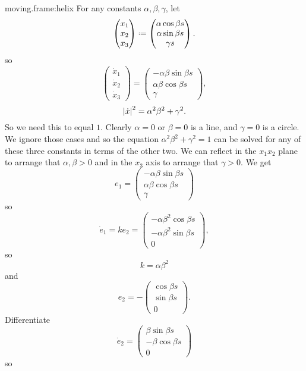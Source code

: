 \begin{answer}{moving.frame:helix}
For any constants \(\alpha,\beta,\gamma\), let
\[
\begin{pmatrix}
x_1\\
x_2\\
x_3
\end{pmatrix}
\defeq
\begin{pmatrix}
\alpha \cos \beta s \\
\alpha \sin \beta s\\
\gamma s
\end{pmatrix}.
\]
so
\[
\begin{pmatrix}
\dot{x}_1\\
\dot{x}_2\\
\dot{x}_3
\end{pmatrix}
=
\begin{pmatrix}
-\alpha\beta \sin \beta s \\
\alpha \beta \cos \beta s\\
\gamma
\end{pmatrix},
\]
\[
\norm{\dot{x}}^2=\alpha^2\beta^2+\gamma^2.
\]
So we need this to equal \(1\).
Clearly \(\alpha=0\) or \(\beta=0\) is a line, and \(\gamma=0\) is a circle.
We ignore those cases and so the equation \(\alpha^2\beta^2+\gamma^2=1\) can be solved for any of these three constants in terms of the other two.
We can reflect in the \(x_1x_2\) plane to arrange that \(\alpha,\beta>0\) and in the \(x_3\) axis to arrange that \(\gamma>0\).
We get
\[
e_1
=
\begin{pmatrix}
-\alpha\beta \sin \beta s \\
\alpha \beta \cos \beta s\\
\gamma
\end{pmatrix}
\]
so
\[
\dot{e}_1=ke_2=
\begin{pmatrix}
-\alpha\beta^2 \cos \beta s \\
-\alpha \beta^2 \sin \beta s\\
0
\end{pmatrix},
\]
so
\[
k=\alpha\beta^2
\]
and
\[
e_2=
-
\begin{pmatrix}
\cos \beta s \\
\sin \beta s\\
0
\end{pmatrix}.
\]
Differentiate
\[
\dot{e}_2
=
\begin{pmatrix}
\beta\sin \beta s \\
-\beta\cos \beta s\\
0
\end{pmatrix}
\]
so
\[
\]
\end{answer}
